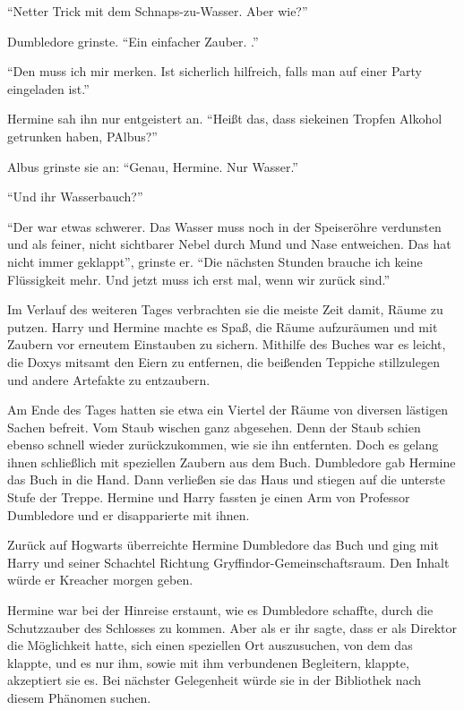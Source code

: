 \enquote{Netter Trick mit dem Schnaps-zu-Wasser. Aber wie?}

Dumbledore grinste. \enquote{Ein einfacher Zauber. .}

\enquote{Den muss ich mir merken. Ist sicherlich hilfreich, falls man auf einer Party eingeladen ist.}

Hermine sah ihn nur entgeistert an. \enquote{Heißt das, dass sie\abs keinen Tropfen Alkohol getrunken haben, P\abs Albus?}

Albus grinste sie an: \enquote{Genau, Hermine. Nur Wasser.}

\enquote{Und ihr Wasserbauch?}

\enquote{Der war etwas schwerer. Das Wasser muss noch in der Speiseröhre verdunsten und als feiner, nicht sichtbarer Nebel durch Mund und Nase entweichen. Das hat nicht immer geklappt}, grinste er. \enquote{Die nächsten Stunden brauche ich keine Flüssigkeit mehr. Und jetzt muss ich erst mal, wenn wir zurück sind.}

Im Verlauf des weiteren Tages verbrachten sie die meiste Zeit damit, Räume zu putzen. Harry und Hermine machte es Spaß, die Räume aufzuräumen und mit Zaubern vor erneutem Einstauben zu sichern. Mithilfe des Buches war es leicht, die Doxys mitsamt den Eiern zu entfernen, die beißenden Teppiche stillzulegen und andere Artefakte zu entzaubern.

Am Ende des Tages hatten sie etwa ein Viertel der Räume von diversen lästigen Sachen befreit. Vom Staub wischen ganz abgesehen. Denn der Staub schien ebenso schnell wieder zurückzukommen, wie sie ihn entfernten. Doch es gelang ihnen schließlich mit speziellen Zaubern aus dem Buch. Dumbledore gab Hermine das Buch in die Hand. Dann verließen sie das Haus und stiegen auf die unterste Stufe der Treppe. Hermine und Harry fassten je einen Arm von Professor Dumbledore und er disapparierte mit ihnen.

Zurück auf Hogwarts überreichte Hermine Dumbledore das Buch und ging mit Harry und seiner Schachtel Richtung Gryf\-fin\-dor-Ge\-mein\-schafts\-raum. Den Inhalt würde er Kreacher morgen geben.

Hermine war bei der Hinreise erstaunt, wie es Dumbledore schaffte, durch die Schutzzauber des Schlosses zu kommen. Aber als er ihr sagte, dass er als Direktor die Möglichkeit hatte, sich einen speziellen Ort auszusuchen, von dem das klappte, und es nur ihm, sowie mit ihm verbundenen Begleitern, klappte, akzeptiert sie es. Bei nächster Gelegenheit würde sie in der Bibliothek nach diesem Phänomen suchen.

